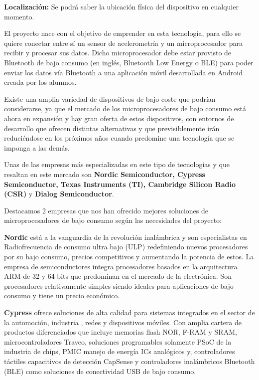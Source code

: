 \textbf{Localización:} Se podrá saber la ubicación física del dispositivo en cualquier momento.


El proyecto nace con el objetivo de emprender en esta tecnología, para ello se quiere conectar entre sí un sensor de acelerometría y un microprocesador para recibir y procesar sus datos. Dicho microprocesador debe estar provisto de Bluetooth de bajo consumo (en inglés, Bluetooth Low Energy o BLE) para poder enviar los datos vía Bluetooth a una aplicación móvil desarrollada en Android creada por los alumnos.

Existe una amplia variedad de dispositivos de bajo coste que podrían considerarse, ya que el mercado de los microprocesadores de bajo consumo está ahora en expansión y hay gran oferta de estos dispositivos, con entornos de desarrollo que ofrecen distintas alternativas y que previsiblemente irán reduciéndose en los próximos años cuando predomine una tecnología que se imponga a las demás.

Unas de las  empresas más especializadas en este tipo de tecnologías y que resaltan en este mercado son \textbf{Nordic Semiconductor, Cypress Semiconductor, Texas Instruments (TI), Cambridge Silicon Radio (CSR)} y \textbf{Dialog Semiconductor}.

Destacamos 2 empresas que nos han ofrecido mejores soluciones de microprocesadores de bajo consumo según las necesidades del proyecto:

\textbf{Nordic} está a la vanguardia de la revolución inalámbrica y son especialistas en Radiofrecuencia de consumo ultra bajo (ULP) redefiniendo nuevos procesadores por su bajo consumo, precios competitivos y aumentando la potencia de estos.
La empresa de semiconductores integra procesadores basados en la arquitectura ARM de 32 y 64 bits que predominan en el mercado de la electrónica. Son procesadores relativamente simples siendo ideales para aplicaciones de bajo consumo y tiene un precio económico. 

\textbf{Cypress} ofrece soluciones de alta calidad para sistemas integrados en el sector de la automoción, industria , redes y dispositivos móviles. Con amplia cartera de productos  diferenciados que incluye memorias flash NOR, F-RAM y SRAM, microcontroladores Traveo, soluciones programables solamente PSoC de la industria de chips, PMIC manejo de energía ICs analógicos y, controladores táctiles capacitivos de detección CapSense y controladores inalámbricos Bluetooth (BLE) como soluciones de conectividad USB de bajo consumo.


